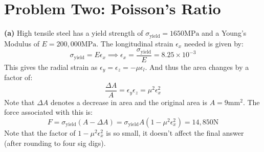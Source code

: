 \documentclass{article}
\begin{document}
\section{Problem Two: Poisson's Ratio}
\textbf{(a)} High tensile steel has a yield strength of $\sigma_\text{yield}=1650\si{\mega\pascal}$ and a Young's Modulus of $E=200,000\si{\mega\pascal}$. The longitudinal strain $\epsilon_x$ needed is given by:
\begin{equation}
    \sigma_\text{yield} = E\epsilon_x \implies \epsilon_x = \frac{\sigma_\text{yield}}{E} = \boxed{8.25 \times 10^{-3}}
    \label{eq:}
\end{equation}
This gives the radial strain as $\epsilon_y=\epsilon_z = -\mu \epsilon_l$. And thus the area changes by a factor of:
\begin{equation}
    \frac{\Delta A}{A} = \epsilon_y\epsilon_z = \mu^2 \epsilon_x^2
    \label{eq:}
\end{equation}
Note that $\Delta A$ denotes a decrease in area and the original area is $A=9\si{\milli\meter\squared}$. The force associated with this is:
\begin{equation}
    F = \sigma_\text{yield}(A-\Delta A)=\sigma_\text{yield}A(1-\mu^2\epsilon_x^2)=\boxed{14,850\si{\newton}}
    \label{eq:}
\end{equation}
Note that the factor of $1-\mu^2\epsilon_x^2$ is so small, it doesn't affect the final answer (after rounding to four sig digs).
\end{document}
